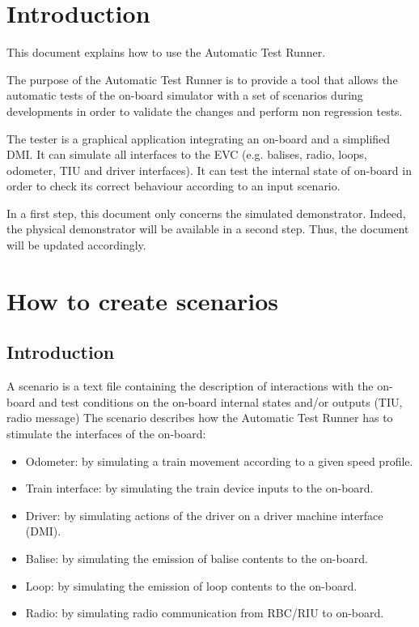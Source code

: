 \documentclass{template/openetcs}
\begin{document}


\section{Introduction}

This document explains how to use the Automatic Test Runner.

The purpose of the Automatic Test Runner is to provide a tool that allows the automatic tests of the on-board simulator with a set of scenarios during developments in order to validate the changes and perform non regression tests.

The tester is a graphical application integrating an on-board and a simplified DMI. It can simulate all interfaces to the EVC (e.g. balises, radio, loops, odometer, TIU and driver interfaces). It can test the internal state of on-board in order to check its correct behaviour according to an input scenario.

In a first step, this document only concerns the simulated demonstrator. Indeed, the physical demonstrator will be available in a second step. Thus, the document will be updated accordingly.

\section{How to create scenarios}
\subsection{Introduction}

A scenario is a text file containing the description of interactions with the on-board and test conditions on the on-board internal states and/or outputs (TIU, radio message)
The scenario describes how the Automatic Test Runner has to stimulate the interfaces of the on-board:

\begin{itemize}
	\item Odometer: by simulating a train movement according to a given speed profile.
	\item Train interface: by simulating the train device inputs to the on-board.
	\item Driver: by simulating actions of the driver on a driver machine interface (DMI).
	\item Balise: by simulating the emission of balise contents to the on-board.
	\item Loop: by simulating the emission of loop contents to the on-board.
	\item Radio: by simulating radio communication from RBC/RIU to on-board.
\end{itemize}
\end{document}
